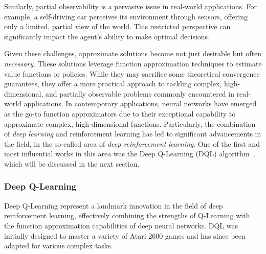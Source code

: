 Similarly, partial observability is a pervasive issue in real-world applications. 
 For example, a self-driving car perceives its environment through sensors, 
 offering only a limited, partial view of the world. 
 This restricted perspective can significantly impact the agent's ability to make optimal decisions.

Given these challenges, approximate solutions become not just desirable but often \emph{necessary}. 
 These solutions leverage function approximation techniques to estimate value functions or policies. 
 While they may sacrifice some theoretical convergence guarantees, 
 they offer a more practical approach to tackling complex, 
 high-dimensional, and partially observable problems commonly encountered in real-world applications.
%
In contemporary applications, neural networks have emerged as the go-to function approximators 
 due to their exceptional capability to approximate complex, 
 high-dimensional functions. 
%
Particularly, the combination of \emph{deep learning} and reinforcement learning has led to significant advancements in the field, 
 in the so-called area of \emph{deep reinforcement learning}.
 One of the first and most influential works in this area was the Deep Q-Learning (DQL) algorithm~\cite{DBLP:journals/corr/MnihKSGAWR13}, which will be discussed in the next section.
 \subsubsection{Deep Q-Learning}

 Deep Q-Learning represent a landmark innovation in the field of deep reinforcement learning, 
  effectively combining the strengths of Q-Learning with the function approximation capabilities of deep neural networks.
  DQL was initially designed to master a variety of Atari 2600 games and has since been adapted for various complex tasks.
 
